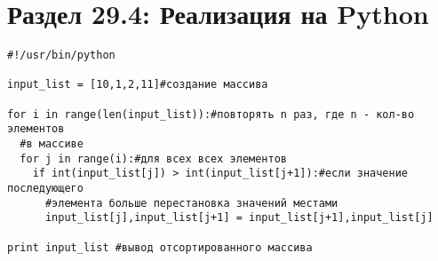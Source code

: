 \section*{Раздел 29.4: Реализация на Python}

\begin{tcolorbox} 
\begin{verbatim}
#!/usr/bin/python

input_list = [10,1,2,11]#создание массива

for i in range(len(input_list)):#повторять n раз, где n - кол-во элементов 
  #в массиве
  for j in range(i):#для всех всех элементов
    if int(input_list[j]) > int(input_list[j+1]):#если значение последующего 
      #элемента больше перестановка значений местами
      input_list[j],input_list[j+1] = input_list[j+1],input_list[j]

print input_list #вывод отсортированного массива
\end{verbatim}
\end{tcolorbox}



